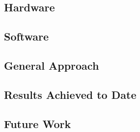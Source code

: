 \documentclass{standalone}
\begin{document}
\subsection{Hardware}


\subsection{Software}


\subsection{General Approach}


\subsection{Results Achieved to Date}


\subsection{Future Work}

\end{document}
